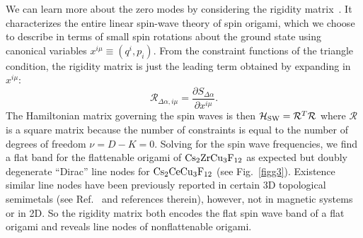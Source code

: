 \documentclass[a4paper,aps,prl,twocolumn,floatfix,showpacs,superscriptaddress]{revtex4-1}
\begin{document}
We can learn more about the zero modes by considering the rigidity matrix~\cite{kane2014topological}. It characterizes the entire linear spin-wave theory of spin origami, which we choose to describe in terms of small spin rotations about the ground state using canonical variables $x^{i\mu} \equiv (q^i,p_i)$. From the constraint functions of the triangle condition, the rigidity matrix is just the leading term obtained by expanding in $x^{i\mu}$:
\begin{equation}
 \mathcal{R}_{\Delta\alpha,i\mu} = \frac{\partial S_{\Delta\alpha}}{\partial x^{i\mu}}.
 \label{eq:rig}
\end{equation}
The Hamiltonian matrix governing the spin waves is then $\mathcal{H}_{\rm SW} = \mathcal{R}^T\mathcal{R}$ where $\mathcal{R}$ is a square matrix because the number of constraints is equal to the number of degrees of freedom $\nu=D-K=0$. Solving for the spin wave frequencies, we find a flat band for the flattenable origami of ${\rm Cs}_2{\rm ZrCu}_3{\rm F}_{12}$ as expected but doubly degenerate ``Dirac'' line nodes for ${\rm Cs}_2{\rm CeCu}_3{\rm F}_{12}$ (see Fig.~\ref{figg3}). Existence similar line nodes have been previously reported in certain 3D topological semimetals (see Ref.~\cite{kim2015dirac} and references therein), however, not in magnetic systems or in 2D. So the rigidity matrix both encodes the flat spin wave band of a flat origami and reveals line nodes of nonflattenable origami. 
\end{document}
